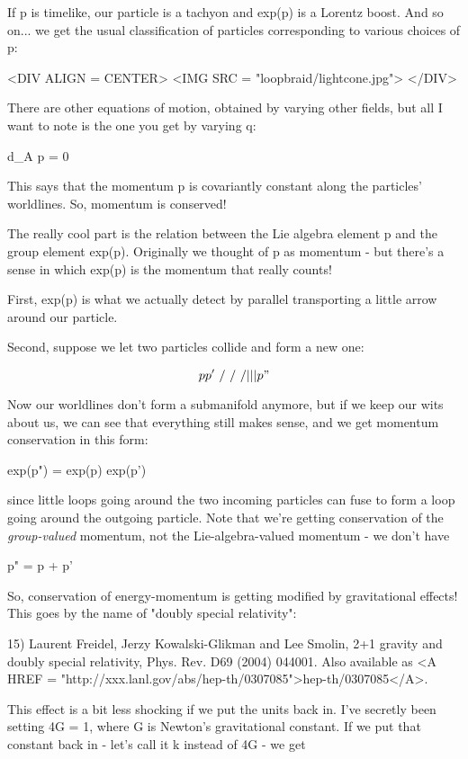 If p is timelike, our particle is a tachyon and exp(p) is a Lorentz
boost.  And so on... we get the usual classification of particles
corresponding to various choices of p:

<DIV ALIGN = CENTER>
<IMG SRC = "loopbraid/lightcone.jpg">
</DIV>


There are other equations of motion, obtained by varying other fields,
but all I want to note is the one you get by varying q:

d_{A} p = 0

This says that the momentum p is covariantly constant along the
particles' worldlines.  So, momentum is conserved!

The really cool part is the relation between the Lie algebra element p 
and the group element exp(p).  Originally we thought of p as momentum - 
but there's a sense in which exp(p) is the momentum that really counts!  

First, exp(p) is what we actually detect by parallel transporting a 
little arrow around our particle.  

Second, suppose we let two particles collide and form a new one:

$$
    p       p'
     \     /
      \   /  
       \ /  
        |   
        |   
        |    
        p"
$$
    

Now our worldlines don't form a submanifold anymore, but if we keep 
our wits about us, we can see that everything still makes sense, and
we get momentum conservation in this form:

exp(p") = exp(p) exp(p')

since little loops going around the two incoming particles can fuse to 
form a loop going around the outgoing particle.  Note that we're getting
conservation of the \emph{group-valued} momentum, not the Lie-algebra-valued
momentum - we don't have

p" = p + p'

So, conservation of energy-momentum is getting modified by gravitational
effects!  This goes by the name of "doubly special relativity":

15) Laurent Freidel, Jerzy Kowalski-Glikman and Lee Smolin, 
2+1 gravity and doubly special relativity, Phys. Rev. D69 (2004) 
044001.  Also available as <A HREF = "http://xxx.lanl.gov/abs/hep-th/0307085">hep-th/0307085</A>.

This effect is a bit less shocking if we put the units back in.  I've
secretly been setting 4\pi G = 1, where G is Newton's gravitational 
constant.  If we put that constant back in - let's call it k instead 
of 4\pi G - we get

